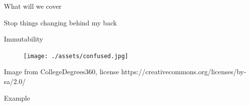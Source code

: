 \documentclass[aspectratio=169]{beamer}
\begin{document}
\begin{frame}
  \begin{center}
    \Huge What will we cover
  \end{center}
\end{frame}

\begin{frame}
  \begin{center}
    \Huge Stop things changing behind my back
  \end{center}
\end{frame}

\begin{frame}
  \begin{center}
    \Huge Immutability
  \end{center}
\end{frame}

\begin{frame}
  \begin{figure}[p]
    \texttt{[image: ./assets/confused.jpg]}
  \end{figure}
  \tiny Image from CollegeDegrees360, license https://creativecommons.org/licenses/by-sa/2.0/
\end{frame}

\begin{frame}
  \begin{center}
    \Huge Example
  \end{center}
\end{frame}
\end{document}
